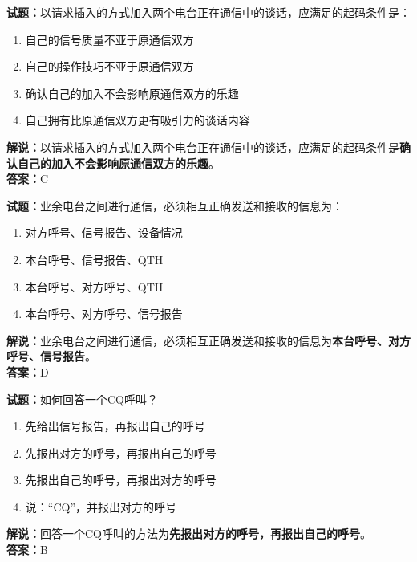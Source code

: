 \documentclass{ctexbook}
\begin{document}
\vspace{\baselineskip}

\noindent\textbf{试题：}以请求插入的方式加入两个电台正在通信中的谈话，应满足的起码条件是：
\begin{enumerate}[leftmargin=3em]
  \item 自己的信号质量不亚于原通信双方
  \item 自己的操作技巧不亚于原通信双方
  \item 确认自己的加入不会影响原通信双方的乐趣
  \item 自己拥有比原通信双方更有吸引力的谈话内容
\end{enumerate}
\noindent\textbf{解说：}以请求插入的方式加入两个电台正在通信中的谈话，应满足的起码条件是\textbf{确认自己的加入不会影响原通信双方的乐趣}。\\\noindent\textbf{答案：}C

\vspace{\baselineskip}

\noindent\textbf{试题：}业余电台之间进行通信，必须相互正确发送和接收的信息为：
\begin{enumerate}[leftmargin=3em]
  \item 对方呼号、信号报告、设备情况
  \item 本台呼号、信号报告、QTH
  \item 本台呼号、对方呼号、QTH
  \item 本台呼号、对方呼号、信号报告
\end{enumerate}
\noindent\textbf{解说：}业余电台之间进行通信，必须相互正确发送和接收的信息为\textbf{本台呼号、对方呼号、信号报告}。\\\noindent\textbf{答案：}D

\vspace{\baselineskip}

\noindent\textbf{试题：}如何回答一个CQ呼叫？
\begin{enumerate}[leftmargin=3em]
  \item 先给出信号报告，再报出自己的呼号
  \item 先报出对方的呼号，再报出自己的呼号
  \item 先报出自己的呼号，再报出对方的呼号
  \item 说：“CQ”，并报出对方的呼号
\end{enumerate}
\noindent\textbf{解说：}回答一个CQ呼叫的方法为\textbf{先报出对方的呼号，再报出自己的呼号}。\\
\noindent\textbf{答案：}B

\vspace{\baselineskip}
\end{document}
